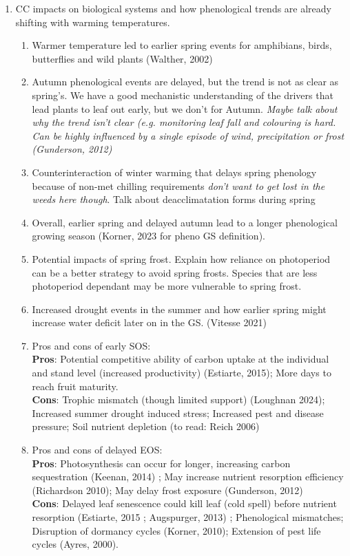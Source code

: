 \documentclass{article}
\begin{document}
\begin{enumerate}

\item CC impacts on biological systems and how phenological trends are already shifting with warming temperatures. 
\begin{enumerate}
\item Warmer temperature led to earlier spring events for amphibians, birds, butterflies and wild plants (Walther, 2002)
\item Autumn phenological events are delayed, but the trend is not as clear as spring's. We have a good mechanistic understanding of the drivers that lead plants to leaf out early, but we don't for Autumn. \textit{Maybe talk about why the trend isn't clear (e.g. monitoring leaf fall and colouring is hard. Can be highly influenced by a single episode of wind, precipitation or frost (Gunderson, 2012)}  
\item Counterinteraction of winter warming that delays spring phenology because of non-met chilling requirements \textit{don't want to get lost in the weeds here though}. Talk about deacclimatation forms during spring
\item Overall, earlier spring and delayed autumn lead to a longer phenological growing season (Korner, 2023 for pheno GS definition).
\item Potential impacts of spring frost. Explain how reliance on photoperiod can be a better strategy to avoid spring frosts. Species that are less photoperiod dependant may be more vulnerable to spring frost.
\item Increased drought events in the summer and how earlier spring might increase water deficit later on in the GS. (Vitesse 2021)
\item Pros and cons of early SOS: \\ 
\textbf{Pros}: Potential competitive ability of carbon uptake at the individual and stand level (increased productivity) (Estiarte, 2015); More days to reach fruit maturity. \\ 
\textbf{Cons}: Trophic mismatch (though limited support) (Loughnan 2024); Increased summer drought induced stress; Increased pest and disease pressure; Soil nutrient depletion (to read: Reich 2006)
\item Pros and cons of delayed EOS: \\
\textbf{Pros}: Photosynthesis can occur for longer, increasing carbon sequestration (Keenan, 2014) ; May increase nutrient resorption efficiency (Richardson 2010); May delay frost exposure (Gunderson, 2012)\\ 
\textbf{Cons}: Delayed leaf senescence could kill leaf (cold spell) before nutrient resorption (Estiarte, 2015 ; Augspurger, 2013) ; Phenological mismatches; Disruption of dormancy cycles (Korner, 2010); Extension of pest life cycles (Ayres, 2000).
\end{enumerate}


\end{enumerate}
\end{document}
